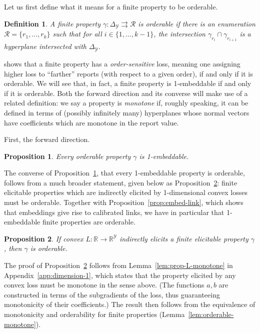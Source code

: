 \documentclass[12pt]{article}
\newcommand{\reals}{\mathbb{R}}
\newcommand{\simplex}{\Delta_\Y}
\newcommand{\R}{\mathcal{R}}
\newcommand{\Y}{\mathcal{Y}}
\newcommand{\toto}{\rightrightarrows}
\newtheorem{proposition}{Proposition}
\newtheorem{definition}{Definition}
\begin{document}
Let us first define what it means for a finite property to be orderable.
\begin{definition}
  A finite property $\gamma:\simplex\toto\R$ is \emph{orderable} if there is an enumeration $\R = \{r_1,\ldots,r_k\}$ such that for all $i\in\{1,\ldots,k-1\}$, the intersection $\gamma_{r_i} \cap \gamma_{r_{i+1}}$ is a hyperplane intersected with $\simplex$.
\end{definition}

\citet{lambert2018elicitation} shows that a finite property has a \emph{order-sensitive} loss, meaning one assigning higher loss to ``farther'' reports (with respect to a given order), if and only if it is orderable.
We will see that, in fact, a finite property is 1-embeddable if and only if it is orderable.
Both the forward direction and its converse will make use of a related definition: we say a property is \emph{monotone} if, roughly speaking, it can be defined in terms of (possibly infinitely many) hyperplanes whose normal vectors have coefficients which are monotone in the report value.

First, the forward direction.

\begin{proposition}\label{prop:orderable-embed}
  Every orderable property $\gamma$ is 1-embeddable.
\end{proposition}

The converse of Proposition~\ref{prop:orderable-embed}, that every 1-embeddable property is orderable, follows from a much broader statement, given below as Proposition~\ref{prop:indirect-orderable}: finite elicitable properties which are indirectly elicited by 1-dimensional convex losses must be orderable.
Together with Proposition~\ref{prop:embed-link}, which shows that embeddings give rise to calibrated links, we have in particular that 1-embeddable finite properties are orderable.

\begin{proposition}\label{prop:indirect-orderable}
  If convex $L : \reals \to \reals^\Y$ indirectly elicits a finite elicitable property $\gamma$, then $\gamma$ is orderable.
\end{proposition}

The proof of Proposition~\ref{prop:indirect-orderable} follows from Lemma~\ref{lem:prop-L-monotone} in Appendix~\ref{app:dimension-1}, which states that the property elicited by any convex loss must be monotone in the sense above.
(The functions $a,b$ are constructed in terms of the subgradients of the loss, thus guaranteeing monotonicity of their coefficients.)
The result then follows from the equivalence of monotonicity and orderability for finite properties (Lemma~\ref{lem:orderable-monotone}).
\end{document}
